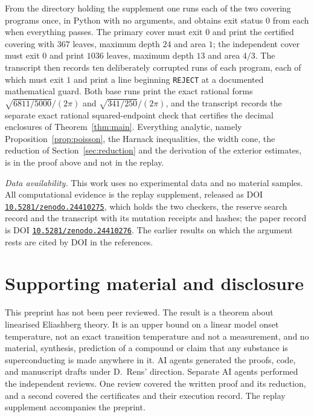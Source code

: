 \documentclass[10pt]{article}
\theoremstyle{remark}
\newcommand{\DOI}[1]{\href{https://doi.org/#1}{\nolinkurl{#1}}}
\newcommand*{\PAPERDOI}{10.5281/zenodo.24410276}
\newcommand*{\SUPPLEMENTDOI}{10.5281/zenodo.24410275}
\begin{document}
From the directory holding the supplement one runs each of the two covering programs once, in Python with no arguments, and obtains exit status $0$ from each when everything passes. The primary cover must exit $0$ and print the certified covering with $367$ leaves, maximum depth $24$ and area $1$; the independent cover must exit $0$ and print $1036$ leaves, maximum depth $13$ and area $4/3$. The transcript then records ten deliberately corrupted runs of each program, each of which must exit $1$ and print a line beginning \texttt{REJECT} at a documented mathematical guard. Both base runs print the exact rational forms $\sqrt{6811/5000}/(2\pi)$ and $\sqrt{341/250}/(2\pi)$, and the transcript records the separate exact rational squared-endpoint check that certifies the decimal enclosures of Theorem~\ref{thm:main}. Everything analytic, namely Proposition~\ref{prop:poisson}, the Harnack inequalities, the width cone, the reduction of Section~\ref{sec:reduction} and the derivation of the exterior estimates, is in the proof above and not in the replay.

\emph{Data availability.} This work uses no experimental data and no material samples. All computational evidence is the replay supplement, released as DOI \DOI{\SUPPLEMENTDOI}, which holds the two checkers, the reserve search record and the transcript with its mutation receipts and hashes; the paper record is DOI \DOI{\PAPERDOI}. The earlier results on which the argument rests are cited by DOI in the references.

\section*{Supporting material and disclosure}

This preprint has not been peer reviewed. The result is a theorem about linearised Eliashberg theory. It is an upper bound on a linear model onset temperature, not an exact transition temperature and not a measurement, and no material, synthesis, prediction of a compound or claim that any substance is superconducting is made anywhere in it. AI agents generated the proofs, code, and manuscript drafts under D.~Rens' direction. Separate AI agents performed the independent reviews. One review covered the written proof and its reduction, and a second covered the certificates and their execution record. The replay supplement accompanies the preprint.

\begingroup
\raggedright


\endgroup
\end{document}
